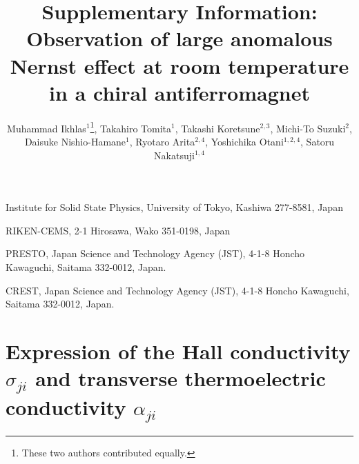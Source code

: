 \documentclass[amsmath,amssymb]{nature}
\begin{document}

\newpage
\title{\Large{\bf{Supplementary Information:\\ Observation of large anomalous Nernst effect at room temperature in a chiral antiferromagnet}}} 



\author{Muhammad Ikhlas$^1$\footnote[1]{These two authors contributed equally.}, Takahiro Tomita$^1$\footnotemark[1], Takashi Koretsune$^{2,3}$, Michi-To Suzuki$^{2}$, Daisuke Nishio-Hamane\color{black}$^1$, Ryotaro Arita$^{2,4}$, Yoshichika Otani$^{1,2,4}$, Satoru Nakatsuji$^{1,4}$\\}

	
	\maketitle
	
	\begin{affiliations}
		\item Institute for Solid State Physics, University of Tokyo, Kashiwa 277-8581, Japan
		\item RIKEN-CEMS, 2-1 Hirosawa, Wako 351-0198, Japan		
		\item PRESTO, Japan Science and Technology Agency (JST), 4-1-8 Honcho Kawaguchi, Saitama 332-0012, Japan.		
		\item CREST, Japan Science and Technology Agency (JST), 4-1-8 Honcho Kawaguchi, Saitama 332-0012, Japan.		
		
	\end{affiliations}
	
	
	
\section{Expression of the Hall conductivity $\sigma_{ji}$ and transverse thermoelectric conductivity $\alpha_{ji}$}
	
\end{document}
